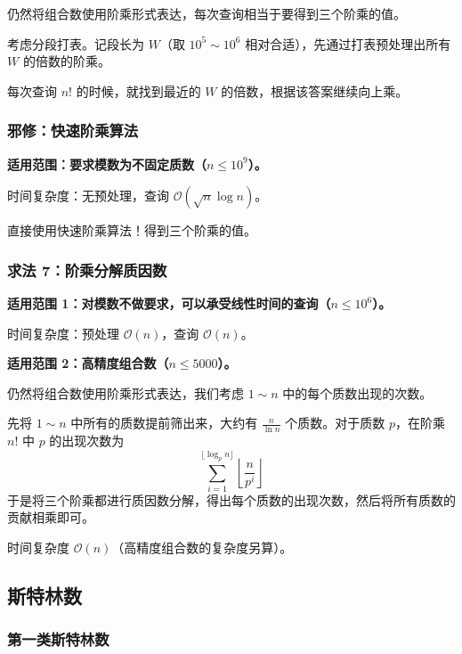 仍然将组合数使用阶乘形式表达，每次查询相当于要得到三个阶乘的值。

考虑分段打表。记段长为 $W$（取 $10^5 \sim 10^6$ 相对合适），先通过打表预处理出所有 $W$ 的倍数的阶乘。

每次查询 $n!$ 的时候，就找到最近的 $W$ 的倍数，根据该答案继续向上乘。

\subsubsection{邪修：快速阶乘算法}

\begin{quoteblock}
\textbf{适用范围：要求模数为不固定质数（$n \leq 10^9$）。}

时间复杂度：无预处理，查询 $\mathcal{O}(\sqrt{n} \log n)$。
\end{quoteblock}

直接使用快速阶乘算法！得到三个阶乘的值。

\subsubsection{求法 7：阶乘分解质因数}

\begin{quoteblock}
\textbf{适用范围 1：对模数不做要求，可以承受线性时间的查询（$n \leq 10^6$）。}

时间复杂度：预处理 $\mathcal{O}(n)$，查询 $\mathcal{O}(n)$。

\textbf{适用范围 2：高精度组合数（$n \leq 5000$）。}
\end{quoteblock}

仍然将组合数使用阶乘形式表达，我们考虑 $1 \sim n$ 中的每个质数出现的次数。

先将 $1 \sim n$ 中所有的质数提前筛出来，大约有 $\frac{n}{\ln n}$ 个质数。对于质数 $p$，在阶乘 $n!$ 中 $p$ 的出现次数为
\[
\sum_{i = 1}^{\lfloor \log_p n \rfloor} \left\lfloor \frac{n}{p^i} \right\rfloor
\]
于是将三个阶乘都进行质因数分解，得出每个质数的出现次数，然后将所有质数的贡献相乘即可。

时间复杂度 $\mathcal{O}(n)$（高精度组合数的复杂度另算）。

\subsection{斯特林数}

\subsubsection{第一类斯特林数}

